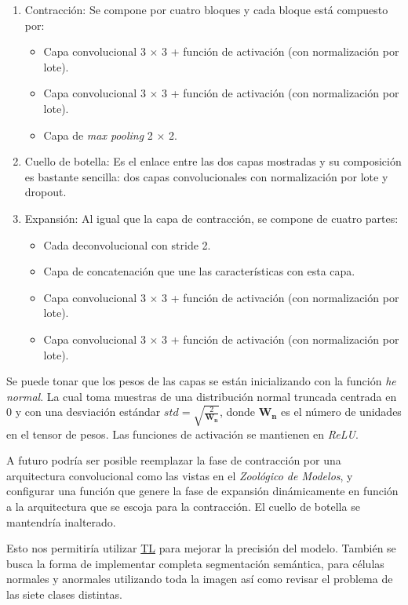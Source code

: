 \begin{enumerate}
    \item{Contracción:} Se compone por cuatro bloques y cada bloque está compuesto por:
        \begin{itemize}
            \item Capa convolucional 3 $\times$ 3 + función de activación (con normalización por lote).
            \item Capa convolucional 3 $\times$ 3 + función de activación (con normalización por lote).
            \item Capa de \emph{max pooling} 2 $\times$ 2.
        \end{itemize}
    \item{Cuello de botella:} Es el enlace entre las dos capas mostradas y su composición es bastante 
    sencilla: dos capas convolucionales con normalización por lote y dropout.
    \item{Expansión:} Al igual que la capa de contracción, se compone de cuatro partes:
    \begin{itemize}
        \item Cada deconvolucional con stride 2.
        \item Capa de concatenación que une las características con esta capa.
        \item  Capa convolucional 3 $\times$ 3 + función de activación (con normalización por lote).
        \item  Capa convolucional 3 $\times$ 3 + función de activación (con normalización por lote).
    \end{itemize}
\end{enumerate}

Se puede tonar que los pesos de las capas se están inicializando con la función
\emph{he normal}. La cual toma muestras de una distribución normal truncada
centrada en 0 y con una desviación estándar \(std =
\sqrt{\frac{2}{\mathbf{W_{n}}}}\), donde \(\mathbf{W_{n}}\) es el número de
unidades en el tensor de pesos.  Las funciones de activación se mantienen en
\emph{ReLU}.~\cite{He2015} 

A futuro podría ser posible reemplazar la fase de contracción por una arquitectura
convolucional como las vistas en el \emph{Zoológico de Modelos}, y configurar una función
que genere la fase de expansión dinámicamente en función a la arquitectura que se escoja 
para la contracción. El cuello de botella se mantendría inalterado.

Esto nos permitiría utilizar \hyperlink{abbr}{TL} para mejorar la precisión del
modelo. También se busca la forma de implementar completa segmentación
semántica, para células normales y anormales utilizando toda la imagen así como
revisar el problema de las siete clases distintas.

